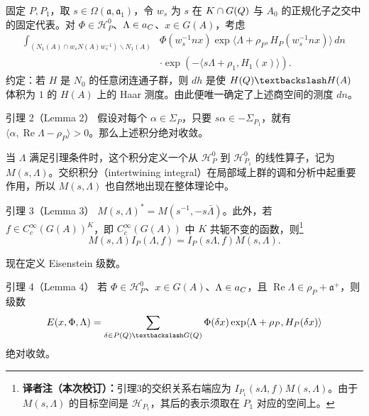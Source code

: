 固定 $P,P_1$，取 $s\in\Omega(\mathfrak a,\mathfrak a_1)$，令 $w_s$ 为 $s$ 在 $K\cap G(Q)$ 与 $A_0$ 的正规化子之交中的固定代表。对 $\Phi\in\mathcal H_P^0$、$\Lambda\in a_C$、$x\in G(A)$，考虑
\[
\begin{split}
 \int_{(N_1(A)\cap w_sN(A)w_s^{-1})\backslash N_1(A)}
 &\Phi(w_s^{-1}nx)\exp\langle\Lambda+\rho_P,H_P(w_s^{-1}nx)\rangle\,dn\\
 &\cdot\exp(-\langle s\Lambda+\rho_1,H_1(x)\rangle).
\end{split}
\]
约定：若 $H$ 是 $N_0$ 的任意闭连通子群，则 $dh$ 是使 $H(\Q)\backslash H(A)$ 体积为 $1$ 的 $H(A)$ 上的 Haar 测度。由此便唯一确定了上述商空间的测度 $dn$。

\begin{originaltheorem}{引理 2（Lemma 2）}
假设对每个 $\alpha\in\Sigma_P$，只要 $s\alpha\in-\Sigma_{P_1}$，就有
$\langle\alpha,\operatorname{Re}\Lambda-\rho_P\rangle>0$。那么上述积分绝对收敛。
\end{originaltheorem}
当 $\Lambda$ 满足引理条件时，这个积分定义一个从 $\mathcal H_P^0$ 到 $\mathcal H_{P_1}^0$ 的线性算子，记为 $M(s,\Lambda)$。交织积分（intertwining integral）在局部域上群的调和分析中起重要作用，所以 $M(s,\Lambda)$ 也自然地出现在整体理论中。

\begin{originaltheorem}{引理 3（Lemma 3）}
$M(s,\Lambda)^*=M(s^{-1},-s\bar\Lambda)$。此外，若
$f\in C_c^\infty(G(A))^K$，即 $C_c^\infty(G(A))$ 中 $K$ 共轭不变的函数，则\footnote{\textbf{译者注（本次校订）：}引理3的交织关系右端应为 $I_{P_1}(s\Lambda,f)M(s,\Lambda)$。由于 $M(s,\Lambda)$ 的目标空间是 $\mathcal H_{P_1}$，其后的表示须取在 $P_1$ 对应的空间上。}
\[
 M(s,\Lambda)I_P(\Lambda,f)=I_P(s\Lambda,f)M(s,\Lambda).
\]
\end{originaltheorem}
现在定义 Eisenstein 级数。
\begin{originaltheorem}{引理 4（Lemma 4）}
若 $\Phi\in\mathcal H_P^0$、$x\in G(A)$、$\Lambda\in a_C$，且
$\operatorname{Re}\Lambda\in\rho_P+\mathfrak a^+$，则级数
\[
 E(x,\Phi,\Lambda)=\sum_{\delta\in P(\Q)\backslash G(\Q)}
 \Phi(\delta x)\exp\langle\Lambda+\rho_P,H_P(\delta x)\rangle
\]
绝对收敛。
\end{originaltheorem}

